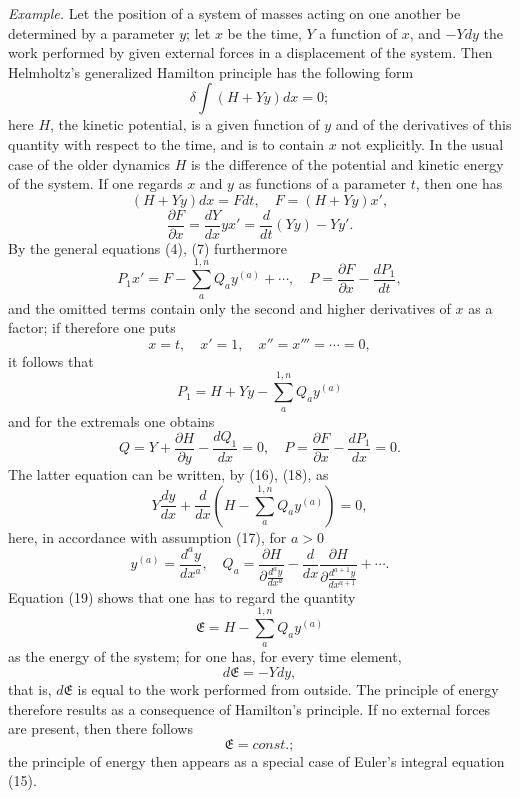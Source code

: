 \documentclass[11pt,a4paper,leqno]{article}
\begin{document}
\emph{Example.} Let the position of a system of masses acting on one another be determined by a parameter $y$; let $x$ be the time, $Y$ a function of $x$, and $-Ydy$ the work performed by given external forces in a displacement of the system. Then Helmholtz's generalized Hamilton principle has the following form
\[
\delta\int(H+Yy)dx=0;
\]
here $H$, the kinetic potential, is a given function of $y$ and of the derivatives of this quantity with respect to the time, and is to contain $x$ not explicitly. In the usual case of the older dynamics $H$ is the difference of the potential and kinetic energy of the system. If one regards $x$ and $y$ as functions of a parameter $t$, then one has
\[
(H+Yy)dx=Fdt,\quad F=(H+Yy)x',
\]
\begin{equation}\tag{16}
\frac{\partial F}{\partial x}=\frac{dY}{dx}yx'=\frac{d}{dt}(Yy)-Yy'.
\end{equation}
By the general equations (4), (7) furthermore
\[
P_1x'=F-\sum_a^{1,n}Q_ay^{(a)}+\cdots,\quad
P=\frac{\partial F}{\partial x}-\frac{dP_1}{dt},
\]
and the omitted terms contain only the second and higher derivatives of $x$ as a factor; if therefore one puts
\begin{equation}\tag{17}
x=t,\quad x'=1,\quad x''=x'''=\cdots=0,
\end{equation}
it follows that
\begin{equation}\tag{18}
P_1=H+Yy-\sum_a^{1,n}Q_ay^{(a)}
\end{equation}
and for the extremals one obtains
\[
Q=Y+\frac{\partial H}{\partial y}-\frac{dQ_1}{dx}=0,
\quad
P=\frac{\partial F}{\partial x}-\frac{dP_1}{dx}=0.
\]
The latter equation can be written, by (16), (18), as
\begin{equation}\tag{19}
Y\frac{dy}{dx}+\frac{d}{dx}\left(H-\sum_a^{1,n}Q_ay^{(a)}\right)=0,
\end{equation}
here, in accordance with assumption (17), for $a>0$
\[
y^{(a)}=\frac{d^ay}{dx^a},\quad
Q_a=\frac{\partial H}{\partial\frac{d^ay}{dx^a}}-\frac{d}{dx}\frac{\partial H}{\partial\frac{d^{a+1}y}{dx^{a+1}}}+\cdots.
\]
Equation (19) shows that one has to regard the quantity
\[
\mathfrak E=H-\sum_a^{1,n}Q_ay^{(a)}
\]
as the energy of the system; for one has, for every time element,
\[
d\mathfrak E=-Ydy,
\]
that is, $d\mathfrak E$ is equal to the work performed from outside. The principle of energy therefore results as a consequence of Hamilton's principle. If no external forces are present, then there follows
\[
\mathfrak E=const.;
\]
the principle of energy then appears as a special case of Euler's integral equation (15).
\end{document}
